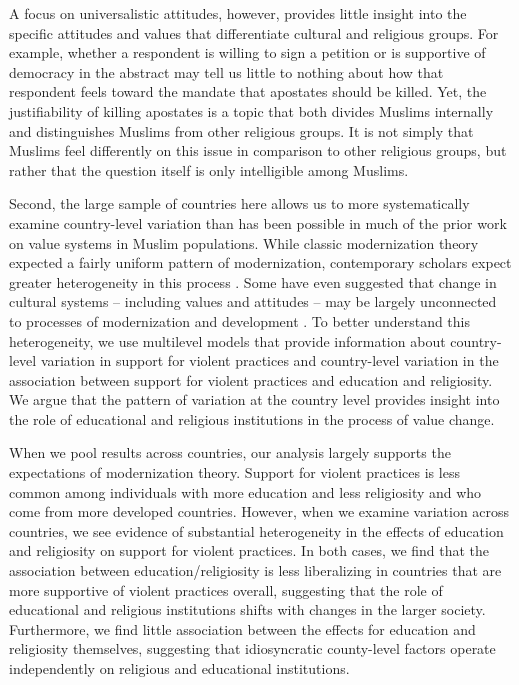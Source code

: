 \documentclass[10pt,letterpaper]{article}
\begin{document}
A focus on universalistic attitudes, however, provides little insight
into the specific attitudes and values that differentiate cultural and
religious groups. For example, whether a respondent is willing to sign a
petition or is supportive of democracy in the abstract may tell us
little to nothing about how that respondent feels toward the mandate
that apostates should be killed. Yet, the justifiability of killing
apostates is a topic that both divides Muslims internally and
distinguishes Muslims from other religious groups. It is not simply that
Muslims feel differently on this issue in comparison to other religious
groups, but rather that the question itself is only intelligible among
Muslims.

Second, the large sample of countries here allows us to more
systematically examine country-level variation than has been possible in
much of the prior work on value systems in Muslim populations. While
classic modernization theory expected a fairly uniform pattern of
modernization, contemporary scholars expect greater heterogeneity in
this process \cite{eisenstadt_civilizational_2001}. Some have even
suggested that change in cultural systems -- including values and
attitudes -- may be largely unconnected to processes of modernization
and development \cite{huntington_clash_1996}. To better understand this
heterogeneity, we use multilevel models that provide information about
country-level variation in support for violent practices and
country-level variation in the association between support for violent
practices and education and religiosity. We argue that the pattern of
variation at the country level provides insight into the role of
educational and religious institutions in the process of value change.

When we pool results across countries, our analysis largely supports the
expectations of modernization theory. Support for violent practices is
less common among individuals with more education and less religiosity
and who come from more developed countries. However, when we examine
variation across countries, we see evidence of substantial heterogeneity
in the effects of education and religiosity on support for violent
practices. In both cases, we find that the association between
education/religiosity is less liberalizing in countries that are more
supportive of violent practices overall, suggesting that the role of
educational and religious institutions shifts with changes in the larger
society. Furthermore, we find little association between the effects for
education and religiosity themselves, suggesting that idiosyncratic
county-level factors operate independently on religious and educational
institutions.
\end{document}
